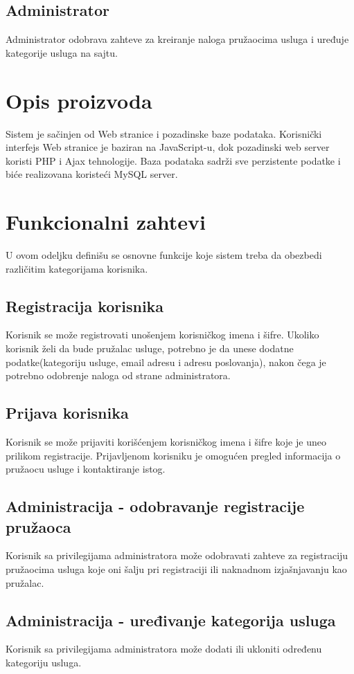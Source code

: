 \documentclass[a4paper,12pt]{report}
\begin{document}
\subsection{Administrator}
Administrator odobrava zahteve za kreiranje naloga pružaocima usluga i uređuje kategorije usluga na sajtu.
\section{Opis proizvoda}
Sistem je sačinjen od Web stranice i pozadinske baze podataka. Korisnički interfejs Web stranice je baziran na JavaScript-u, dok pozadinski web server koristi PHP i Ajax tehnologije. Baza podataka sadrži sve perzistente podatke i biće realizovana koristeći MySQL server.
\section{Funkcionalni zahtevi}
U ovom odeljku definišu se osnovne funkcije koje sistem treba da obezbedi različitim kategorijama korisnika.
\subsection{Registracija korisnika}
Korisnik se može registrovati unošenjem korisničkog imena i šifre. Ukoliko korisnik želi da bude pružalac usluge, potrebno je da unese dodatne podatke(kategoriju usluge, email adresu i adresu poslovanja), nakon čega je potrebno odobrenje naloga od strane administratora. 
\subsection{Prijava korisnika}
Korisnik se može prijaviti korišćenjem korisničkog imena i šifre koje je uneo prilikom registracije. Prijavljenom korisniku je omogućen pregled informacija o pružaocu usluge i kontaktiranje istog.
\subsection{Administracija - odobravanje registracije pružaoca}
Korisnik sa privilegijama administratora može odobravati zahteve za registraciju pružaocima usluga koje oni šalju pri registraciji ili naknadnom izjašnjavanju kao pružalac.

\subsection{Administracija - uređivanje kategorija usluga}
Korisnik sa privilegijama administratora može dodati ili ukloniti određenu kategoriju usluga.
\end{document}

